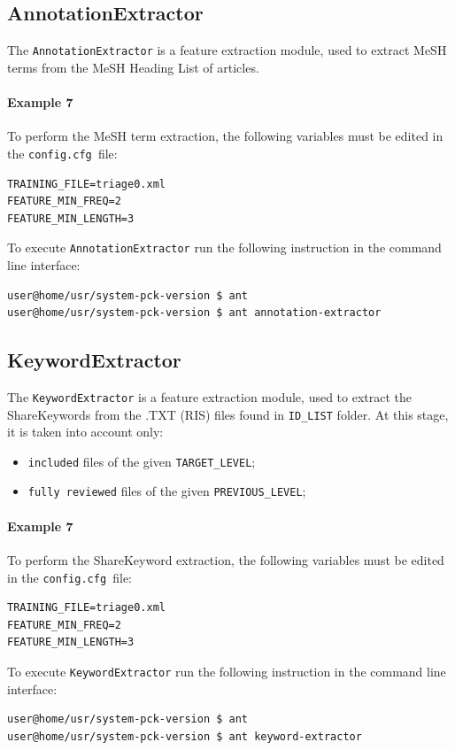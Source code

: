 \documentclass[11pt]{article}
\newcommand{\configfile}{\texttt{config.cfg{ }}}
\begin{document}
\subsection{AnnotationExtractor}
The \texttt{AnnotationExtractor} is a feature extraction module, used to extract MeSH terms
from the MeSH Heading List of articles.
\paragraph{Example 7}
To perform the MeSH term extraction, the following variables must be edited in the \configfile file:
\begin{lstlisting}
TRAINING_FILE=triage0.xml
FEATURE_MIN_FREQ=2
FEATURE_MIN_LENGTH=3
\end{lstlisting}
To execute \texttt{AnnotationExtractor} run the following instruction in the command line interface:
\begin{lstlisting}
user@home/usr/system-pck-version $ ant
user@home/usr/system-pck-version $ ant annotation-extractor
\end{lstlisting}

\subsection{KeywordExtractor}
The \texttt{KeywordExtractor} is a feature extraction module, used to extract the ShareKeywords
from the .TXT (RIS) files found in \texttt{ID\_LIST} folder.
At this stage, it is taken into account only:
\begin{itemize}
 \item \texttt{included} files of the given \texttt{TARGET\_LEVEL};
 \item \texttt{fully reviewed} files of the given \texttt{PREVIOUS\_LEVEL};
\end{itemize}

\paragraph{Example 7}
To perform the ShareKeyword extraction, the following variables must be edited in the \configfile file:
\begin{lstlisting}
TRAINING_FILE=triage0.xml
FEATURE_MIN_FREQ=2
FEATURE_MIN_LENGTH=3
\end{lstlisting}
To execute \texttt{KeywordExtractor} run the following instruction in the command line interface:
\begin{lstlisting}
user@home/usr/system-pck-version $ ant
user@home/usr/system-pck-version $ ant keyword-extractor
\end{lstlisting}
\end{document}
